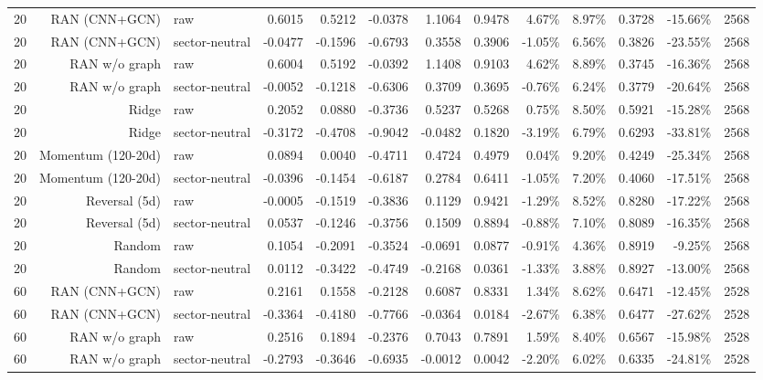 \documentclass[10pt]{article}
\begin{document}
\begin{longtable}{rrlrrrrrrrrrr}
20 & RAN (CNN+GCN) & raw & 0.6015 & 0.5212 & -0.0378 & 1.1064 & 0.9478 & 4.67\% & 8.97\% & 0.3728 & -15.66\% & 2568 \\
20 & RAN (CNN+GCN) & sector-neutral & -0.0477 & -0.1596 & -0.6793 & 0.3558 & 0.3906 & -1.05\% & 6.56\% & 0.3826 & -23.55\% & 2568 \\
20 & RAN w/o graph & raw & 0.6004 & 0.5192 & -0.0392 & 1.1408 & 0.9103 & 4.62\% & 8.89\% & 0.3745 & -16.36\% & 2568 \\
20 & RAN w/o graph & sector-neutral & -0.0052 & -0.1218 & -0.6306 & 0.3709 & 0.3695 & -0.76\% & 6.24\% & 0.3779 & -20.64\% & 2568 \\
20 & Ridge & raw & 0.2052 & 0.0880 & -0.3736 & 0.5237 & 0.5268 & 0.75\% & 8.50\% & 0.5921 & -15.28\% & 2568 \\
20 & Ridge & sector-neutral & -0.3172 & -0.4708 & -0.9042 & -0.0482 & 0.1820 & -3.19\% & 6.79\% & 0.6293 & -33.81\% & 2568 \\
20 & Momentum (120-20d) & raw & 0.0894 & 0.0040 & -0.4711 & 0.4724 & 0.4979 & 0.04\% & 9.20\% & 0.4249 & -25.34\% & 2568 \\
20 & Momentum (120-20d) & sector-neutral & -0.0396 & -0.1454 & -0.6187 & 0.2784 & 0.6411 & -1.05\% & 7.20\% & 0.4060 & -17.51\% & 2568 \\
20 & Reversal (5d) & raw & -0.0005 & -0.1519 & -0.3836 & 0.1129 & 0.9421 & -1.29\% & 8.52\% & 0.8280 & -17.22\% & 2568 \\
20 & Reversal (5d) & sector-neutral & 0.0537 & -0.1246 & -0.3756 & 0.1509 & 0.8894 & -0.88\% & 7.10\% & 0.8089 & -16.35\% & 2568 \\
20 & Random & raw & 0.1054 & -0.2091 & -0.3524 & -0.0691 & 0.0877 & -0.91\% & 4.36\% & 0.8919 & -9.25\% & 2568 \\
20 & Random & sector-neutral & 0.0112 & -0.3422 & -0.4749 & -0.2168 & 0.0361 & -1.33\% & 3.88\% & 0.8927 & -13.00\% & 2568 \\
60 & RAN (CNN+GCN) & raw & 0.2161 & 0.1558 & -0.2128 & 0.6087 & 0.8331 & 1.34\% & 8.62\% & 0.6471 & -12.45\% & 2528 \\
60 & RAN (CNN+GCN) & sector-neutral & -0.3364 & -0.4180 & -0.7766 & -0.0364 & 0.0184 & -2.67\% & 6.38\% & 0.6477 & -27.62\% & 2528 \\
60 & RAN w/o graph & raw & 0.2516 & 0.1894 & -0.2376 & 0.7043 & 0.7891 & 1.59\% & 8.40\% & 0.6567 & -15.98\% & 2528 \\
60 & RAN w/o graph & sector-neutral & -0.2793 & -0.3646 & -0.6935 & -0.0012 & 0.0042 & -2.20\% & 6.02\% & 0.6335 & -24.81\% & 2528 \\

\end{longtable}
\end{document}
